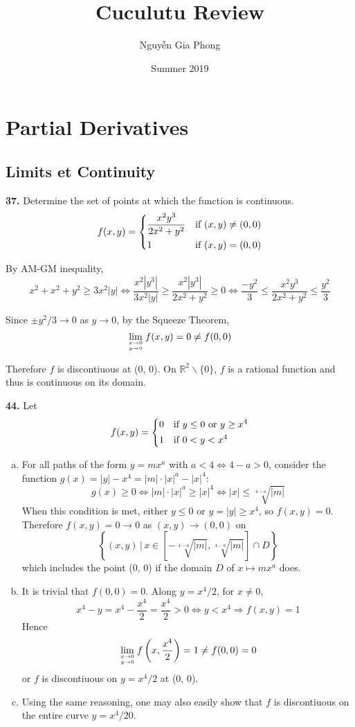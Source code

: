 \documentclass[a4paper,12pt]{article}
\title{Cuculutu Review}
\author{Nguyễn Gia Phong}
\date{Summer 2019}
\newcommand{\exercise}[1]{\noindent\textbf{#1.}}
\begin{document}
\maketitle
\setcounter{section}{13}
\section{Partial Derivatives}
\setcounter{subsection}{1}
\subsection{Limits et Continuity}
\exercise{37} Determine the set of points at which the function is continuous.
\[f(x, y) = \begin{dcases}
  \frac{x^2 y^3}{2x^2 + y^2} &\text{if }(x, y) \neq (0, 0)\\
  1 &\text{if }(x, y) = (0, 0)
\end{dcases}\]

By AM-GM inequality,
\[x^2 + x^2 + y^2 \geq 3x^2|y|
\iff \frac{x^2|y^3|}{3x^2|y|} \geq \frac{x^2|y^3|}{2x^2 + y^2} \geq 0
\iff \frac{-y^2}{3} \leq \frac{x^2 y^3}{2x^2 + y^2} \leq \frac{y^2}{3}\]

Since $\pm y^2/3 \to 0$ as $y \to 0$, by the Squeeze Theorem,
\[\lim_{x\to 0\atop y\to 0}f(x, y) = 0 \neq f(0, 0)\]

Therefore $f$ is discontiuous at (0, 0). On $\mathbb R^2\backslash\{0\}$,
$f$ is a rational function and thus is continuous on its domain.

\exercise{44} Let
\[f(x, y) = \begin{dcases}
  0 &\text{if }y \leq 0\text{ or }y \geq x^4\\
  1 &\text{if }0 < y < x^4
\end{dcases}\]

\begin{enumerate}[(a)]
  \item For all paths of the form $y = mx^a$ with $a < 4 \iff 4 - a > 0$,
    consider the function $g(x) = |y| - x^4 = |m|\cdot|x|^a - |x|^4$:
    \[g(x) \geq 0 \iff |m|\cdot|x|^a \geq |x|^4 \iff |x| \leq \sqrt[4-a]{|m|}\]
    When this condition is met, either $y \leq 0$ or $y = |y| \geq x^4$,
    so $f(x, y) = 0$. Therefore $f(x, y) = 0 \to 0$ as $(x, y) \to (0, 0)$ on
    \[\left\{(x, y)\,\Big|\,
    x \in \left[-\sqrt[4-a]{|m|}, \sqrt[4-a]{|m|}\right] \cap D\right\}\]
    which includes the point (0, 0) if the domain $D$ of $x \mapsto mx^a$ does.
  \item It is trivial that $f(0, 0) = 0$. Along $y = x^4/2$, for $x \neq 0$,
    \[x^4 - y = x^4 - \frac{x^4}{2} = \frac{x^4}{2} > 0
    \iff y < x^4 \Longrightarrow f(x, y) = 1\]
    Hence \[\lim_{x\to 0\atop y\to 0} f\left(x, \frac{x^4}{2}\right) = 1
    \neq f(0, 0) = 0\] or $f$ is discontiuous on $y = x^4/2$ at (0, 0).
  \item Using the same reasoning, one may also easily show that
    $f$ is discontiuous on the entire curve $y = x^4/20$.
\end{enumerate}
\end{document}
